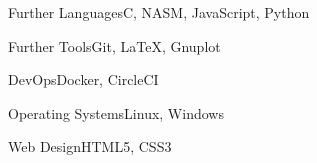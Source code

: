 \documentclass[a4paper,10pt]{cv}
\begin{document}
      \begin{multicols}{2}
        \begin{cvSkillGroup}{Further Languages}{C, NASM, JavaScript, Python}
        \end{cvSkillGroup}
        \begin{cvSkillGroup}{Further Tools}{Git, LaTeX, Gnuplot}
        \end{cvSkillGroup}
        \begin{cvSkillGroup}{DevOps}{Docker, CircleCI}
        \end{cvSkillGroup}
        \begin{cvSkillGroup}{Operating Systems}{Linux, Windows}
        \end{cvSkillGroup}
        \begin{cvSkillGroup}{Web Design}{HTML5, CSS3}
        \end{cvSkillGroup}

\end{multicols}
\end{document}
